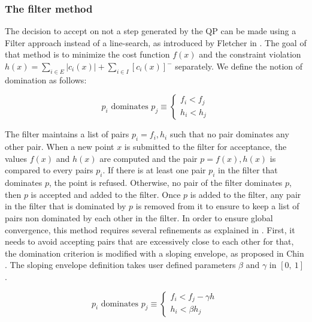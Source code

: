 \subsubsection{The filter method}
The decision to accept on not a step generated by the QP can be made using a Filter approach instead of a line-search, as introduced by Fletcher in \cite{fletcher:mathprog:2000}.
The goal of that method is to minimize the cost function $f(x)$ and the constraint violation $h(x) = \sum_{i\in E}{|c_i(x)|} + \sum_{i\in I}{[c_i(x)]^-}$ separately.
We define the notion of domination as follows:

\begin{definition}
  \begin{equation}
    p_i \text{ dominates }p_j \equiv \left\{
        \begin{array}{l}
    f_i < f_j \\
    h_i < h_j
  \end{array}  \right.
  \end{equation}
\end{definition}

The filter maintains a list of pairs $p_i={f_i, h_i}$ such that no pair dominates any other pair.
When a new point $x$ is submitted to the filter for acceptance, the values $f(x)$ and $h(x)$ are computed and the pair $p = {f(x), h(x)}$ is compared to every pairs $p_i$.
If there is at least one pair $p_i$ in the filter that dominates $p$, the point is refused.
Otherwise, no pair of the filter dominates $p$, then $p$ is accepted and added to the filter.
Once $p$ is added to the filter, any pair in the filter that is dominated by $p$ is removed from it to ensure to keep a list of pairs non dominated by each other in the filter.
In order to ensure global convergence, this method requires several refinements as explained in \cite{fletcher:mathprog:2000}.
First, it needs to avoid accepting pairs that are excessively close to each other for that, the domination criterion is modified with a sloping envelope, as proposed in Chin \cite{chin:mathprog:2003}.
The sloping envelope definition takes user defined parameters $\beta$ and $\gamma$ in $[0,\ 1]$.

\begin{definition}
  \begin{equation}
    p_i \text{ dominates }p_j \equiv \left\{
        \begin{array}{l}
    f_i < f_j - \gamma h\ \\
    h_i < \beta h_j
  \end{array}  \right.
  \end{equation}
\end{definition}

